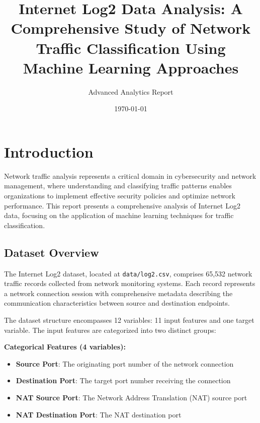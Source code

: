 \documentclass[12pt,a4paper]{article}
\title{\textbf{Internet Log2 Data Analysis: A Comprehensive Study of Network Traffic Classification Using Machine Learning Approaches}}
\author{Advanced Analytics Report}
\date{\today}
\begin{document}
\maketitle

\tableofcontents
\newpage

\section{Introduction}

Network traffic analysis represents a critical domain in cybersecurity and network management, where understanding and classifying traffic patterns enables organizations to implement effective security policies and optimize network performance. This report presents a comprehensive analysis of Internet Log2 data, focusing on the application of machine learning techniques for traffic classification.

\subsection{Dataset Overview}

The Internet Log2 dataset, located at \texttt{data/log2.csv}, comprises 65,532 network traffic records collected from network monitoring systems. Each record represents a network connection session with comprehensive metadata describing the communication characteristics between source and destination endpoints.

The dataset structure encompasses 12 variables: 11 input features and one target variable. The input features are categorized into two distinct groups:

\textbf{Categorical Features (4 variables):}
\begin{itemize}
    \item \textbf{Source Port}: The originating port number of the network connection
    \item \textbf{Destination Port}: The target port number receiving the connection
    \item \textbf{NAT Source Port}: The Network Address Translation (NAT) source port
    \item \textbf{NAT Destination Port}: The NAT destination port
\end{itemize}
\end{document}
